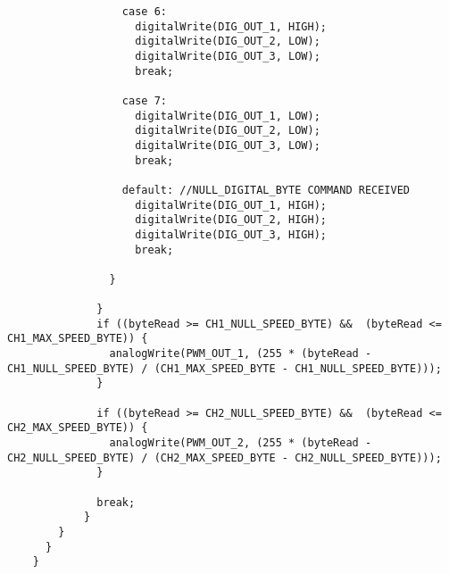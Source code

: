 \begin{lstlisting}
                  case 6:
                    digitalWrite(DIG_OUT_1, HIGH);
                    digitalWrite(DIG_OUT_2, LOW);
                    digitalWrite(DIG_OUT_3, LOW);
                    break;

                  case 7:
                    digitalWrite(DIG_OUT_1, LOW);
                    digitalWrite(DIG_OUT_2, LOW);
                    digitalWrite(DIG_OUT_3, LOW);
                    break;

                  default: //NULL_DIGITAL_BYTE COMMAND RECEIVED
                    digitalWrite(DIG_OUT_1, HIGH);
                    digitalWrite(DIG_OUT_2, HIGH);
                    digitalWrite(DIG_OUT_3, HIGH);
                    break;

                }

              }
              if ((byteRead >= CH1_NULL_SPEED_BYTE) &&  (byteRead <= CH1_MAX_SPEED_BYTE)) {
                analogWrite(PWM_OUT_1, (255 * (byteRead - CH1_NULL_SPEED_BYTE) / (CH1_MAX_SPEED_BYTE - CH1_NULL_SPEED_BYTE)));
              }

              if ((byteRead >= CH2_NULL_SPEED_BYTE) &&  (byteRead <= CH2_MAX_SPEED_BYTE)) {
                analogWrite(PWM_OUT_2, (255 * (byteRead - CH2_NULL_SPEED_BYTE) / (CH2_MAX_SPEED_BYTE - CH2_NULL_SPEED_BYTE)));
              }

              break;
            }
        }
      }
    }
  \end{lstlisting}